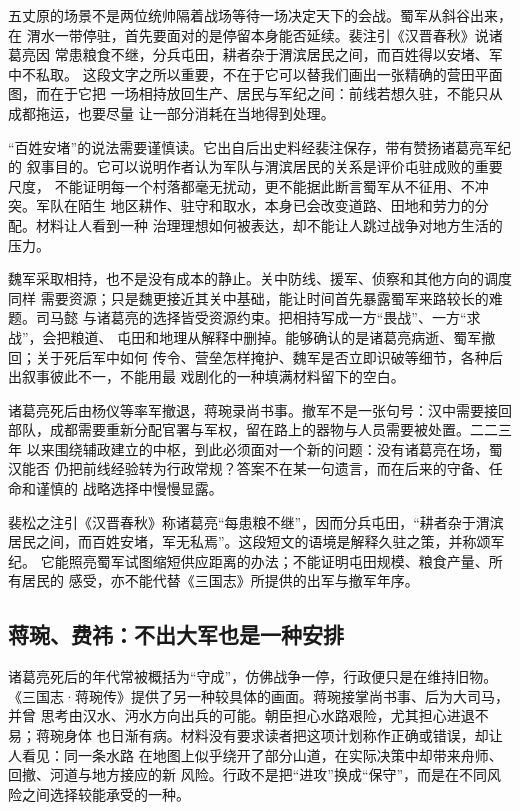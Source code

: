 五丈原的场景不是两位统帅隔着战场等待一场决定天下的会战。蜀军从斜谷出来，在
渭水一带停驻，首先要面对的是停留本身能否延续。裴注引《汉晋春秋》说诸葛亮因
常患粮食不继，分兵屯田，耕者杂于渭滨居民之间，而百姓得以安堵、军中不私取。
这段文字之所以重要，不在于它可以替我们画出一张精确的营田平面图，而在于它把
一场相持放回生产、居民与军纪之间：前线若想久驻，不能只从成都拖运，也要尽量
让一部分消耗在当地得到处理。

“百姓安堵”的说法需要谨慎读。它出自后出史料经裴注保存，带有赞扬诸葛亮军纪的
叙事目的。它可以说明作者认为军队与渭滨居民的关系是评价屯驻成败的重要尺度，
不能证明每一个村落都毫无扰动，更不能据此断言蜀军从不征用、不冲突。军队在陌生
地区耕作、驻守和取水，本身已会改变道路、田地和劳力的分配。材料让人看到一种
治理理想如何被表达，却不能让人跳过战争对地方生活的压力。

魏军采取相持，也不是没有成本的静止。关中防线、援军、侦察和其他方向的调度同样
需要资源；只是魏更接近其关中基础，能让时间首先暴露蜀军来路较长的难题。司马懿
与诸葛亮的选择皆受资源约束。把相持写成一方“畏战”、一方“求战”，会把粮道、
屯田和地理从解释中删掉。能够确认的是诸葛亮病逝、蜀军撤回；关于死后军中如何
传令、营垒怎样掩护、魏军是否立即识破等细节，各种后出叙事彼此不一，不能用最
戏剧化的一种填满材料留下的空白。

诸葛亮死后由杨仪等率军撤退，蒋琬录尚书事。撤军不是一张句号：汉中需要接回
部队，成都需要重新分配官署与军权，留在路上的器物与人员需要被处置。二二三年
以来围绕辅政建立的中枢，到此必须面对一个新的问题：没有诸葛亮在场，蜀汉能否
仍把前线经验转为行政常规？答案不在某一句遗言，而在后来的守备、任命和谨慎的
战略选择中慢慢显露。

\begin{textwindow}
裴松之注引《汉晋春秋》称诸葛亮“每患粮不继”，因而分兵屯田，“耕者杂于渭滨
居民之间，而百姓安堵，军无私焉”。这段短文的语境是解释久驻之策，并称颂军纪。
它能照亮蜀军试图缩短供应距离的办法；不能证明屯田规模、粮食产量、所有居民的
感受，亦不能代替《三国志》所提供的出军与撤军年序。
\end{textwindow}

\subsection{蒋琬、费祎：不出大军也是一种安排}

诸葛亮死后的年代常被概括为“守成”，仿佛战争一停，行政便只是在维持旧物。
《三国志·蒋琬传》提供了另一种较具体的画面。蒋琬接掌尚书事、后为大司马，并曾
思考由汉水、沔水方向出兵的可能。朝臣担心水路艰险，尤其担心进退不易；蒋琬身体
也日渐有病。材料没有要求读者把这项计划称作正确或错误，却让人看见：同一条水路
在地图上似乎绕开了部分山道，在实际决策中却带来舟师、回撤、河道与地方接应的新
风险。行政不是把“进攻”换成“保守”，而是在不同风险之间选择较能承受的一种。

